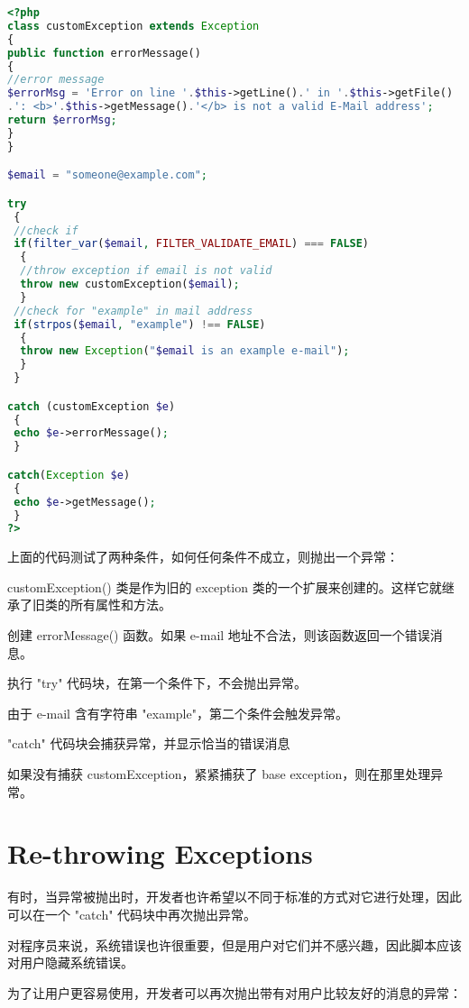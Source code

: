 \begin{lstlisting}[language=PHP]
<?php
class customException extends Exception
{
public function errorMessage()
{
//error message
$errorMsg = 'Error on line '.$this->getLine().' in '.$this->getFile()
.': <b>'.$this->getMessage().'</b> is not a valid E-Mail address';
return $errorMsg;
}
}

$email = "someone@example.com";

try
 {
 //check if 
 if(filter_var($email, FILTER_VALIDATE_EMAIL) === FALSE)
  {
  //throw exception if email is not valid
  throw new customException($email);
  }
 //check for "example" in mail address
 if(strpos($email, "example") !== FALSE)
  {
  throw new Exception("$email is an example e-mail");
  }
 }

catch (customException $e)
 {
 echo $e->errorMessage();
 }

catch(Exception $e)
 {
 echo $e->getMessage();
 }
?>
\end{lstlisting}

上面的代码测试了两种条件，如何任何条件不成立，则抛出一个异常：

\begin{compactenum}
\item customException() 类是作为旧的 exception 类的一个扩展来创建的。这样它就继承了旧类的所有属性和方法。
\item 创建 errorMessage() 函数。如果 e-mail 地址不合法，则该函数返回一个错误消息。
\item 执行 "try" 代码块，在第一个条件下，不会抛出异常。
\item 由于 e-mail 含有字符串 "example"，第二个条件会触发异常。
\item "catch" 代码块会捕获异常，并显示恰当的错误消息
\end{compactenum}


如果没有捕获 customException，紧紧捕获了 base exception，则在那里处理异常。




\section{Re-throwing Exceptions}

有时，当异常被抛出时，开发者也许希望以不同于标准的方式对它进行处理，因此可以在一个 "catch" 代码块中再次抛出异常。


对程序员来说，系统错误也许很重要，但是用户对它们并不感兴趣，因此脚本应该对用户隐藏系统错误。

为了让用户更容易使用，开发者可以再次抛出带有对用户比较友好的消息的异常：


